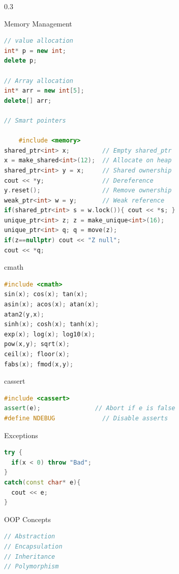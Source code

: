 \documentclass[final]{beamer}
\begin{document}
\begin{frame}[t,fragile]
\begin{columns}[t,totalwidth=0.95\paperwidth, colsep=0.05\paperwidth]
\begin{column}{0.3\paperwidth}
\begin{block}{Memory Management}
\begin{lstlisting}[language=C++]
// value allocation
int* p = new int;
delete p;

// Array allocation
int* arr = new int[5];
delete[] arr;

// Smart pointers

    #include <memory>
shared_ptr<int> x;         // Empty shared_ptr
x = make_shared<int>(12);  // Allocate on heap
shared_ptr<int> y = x;     // Shared ownership
cout << *y;                // Dereference
y.reset();                 // Remove ownership
weak_ptr<int> w = y;       // Weak reference
if(shared_ptr<int> s = w.lock()){ cout << *s; }
unique_ptr<int> z; z = make_unique<int>(16);
unique_ptr<int> q; q = move(z);
if(z==nullptr) cout << "Z null";
cout << *q;
\end{lstlisting}
\end{block}

\begin{block}{cmath}
\begin{lstlisting}[language=C++]
#include <cmath>
sin(x); cos(x); tan(x);
asin(x); acos(x); atan(x);
atan2(y,x);
sinh(x); cosh(x); tanh(x);
exp(x); log(x); log10(x);
pow(x,y); sqrt(x);
ceil(x); floor(x);
fabs(x); fmod(x,y);
\end{lstlisting}
\end{block}



\begin{block}{cassert}
\begin{lstlisting}[language=C++]
#include <cassert>
assert(e);               // Abort if e is false
#define NDEBUG             // Disable asserts
\end{lstlisting}
\end{block}


\begin{block}{Exceptions}
\begin{lstlisting}[language=C++]
try {
  if(x < 0) throw "Bad";
}
catch(const char* e){
  cout << e;
}
\end{lstlisting}
\end{block}

\begin{block}{OOP Concepts}
\begin{lstlisting}[language=C++]
 // Abstraction 
// Encapsulation
// Inheritance
// Polymorphism


\end{lstlisting}
\end{block}
\end{column}
\end{columns}
\end{frame}
\end{document}
